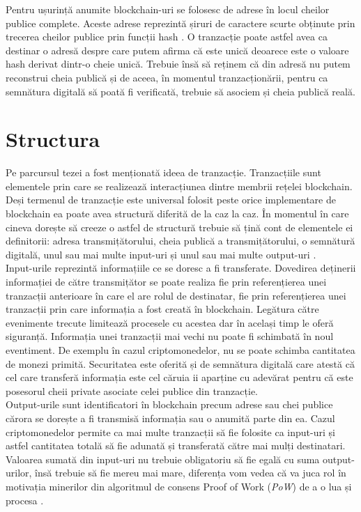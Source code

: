 Pentru ușurință anumite blockchain-uri se folosesc de adrese în locul cheilor publice complete. Aceste adrese reprezintă șiruri de caractere scurte obținute prin trecerea cheilor publice prin funcții hash \cite{Blockchain_Overview_NIST}. O tranzacție poate astfel avea ca destinar o adresă despre care putem afirma că este unică deoarece este o valoare hash derivat dintr-o cheie unică. Trebuie însă să reținem că din adresă nu putem reconstrui cheia publică și de aceea, în momentul tranzacționării, pentru ca semnătura digitală să poată fi verificată, trebuie să asociem și cheia publică reală.\\ 

\clearpage

\section{Structura}

Pe parcursul tezei a fost menționată ideea de tranzacție. Tranzacțiile sunt elementele prin care se realizează interacțiunea dintre membrii rețelei blockchain.\\

Deși termenul de tranzacție este universal folosit peste orice implementare de blockchain ea poate avea structură diferită de la caz la caz. În momentul în care cineva dorește să creeze o astfel de structură trebuie să țină cont de elementele ei definitorii: adresa transmițătorului, cheia publică a transmițătorului, o semnătură digitală, unul sau mai multe input-uri și unul sau mai multe output-uri \cite{Blockchain_Overview_NIST}.\\

Input-urile reprezintă informațiile ce se doresc a fi transferate. Dovedirea deținerii informației de către transmițător se poate realiza fie prin referențierea unei tranzacții anterioare în care el are rolul de destinatar, fie prin referențierea unei tranzacții prin care informația a fost creată în blockchain. Legătura către evenimente trecute limitează procesele cu acestea dar în același timp le oferă siguranță. Informația unei tranzacții mai vechi nu poate fi schimbată în noul eventiment. De exemplu în cazul criptomonedelor, nu se poate schimba cantitatea de monezi primită. Securitatea este oferită și de semnătura digitală care atestă că cel care transferă informația este cel căruia ii aparține cu adevărat pentru că este posesorul cheii private asociate celei publice din tranzacție.\\

Output-urile sunt identificatori în blockchain precum adrese sau chei publice cărora se dorește a fi transmisă informația sau o anumită parte din ea. Cazul criptomonedelor permite ca mai multe tranzacții să fie folosite ca input-uri și astfel cantitatea totală să fie adunată și transferată către mai mulți destinatari. Valoarea sumată din input-uri nu trebuie obligatoriu să fie egală cu suma output-urilor, însă trebuie să fie mereu mai mare, diferența vom vedea că va juca rol în motivația minerilor din algoritmul de consens Proof of Work (\textit{PoW}) de a o lua și procesa \cite{Blockchain_Overview_IEEE}.\\

